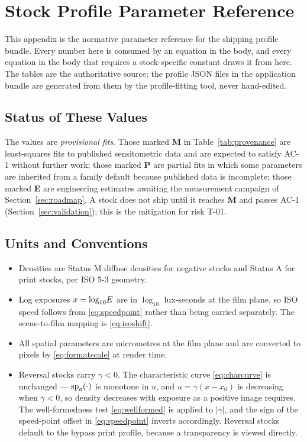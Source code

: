 \section{Stock Profile Parameter Reference}
\label{app:stockparams}

This appendix is the normative parameter reference for the shipping profile
bundle. Every number here is consumed by an equation in the body, and every
equation in the body that requires a stock-specific constant draws it from
here. The tables are the authoritative source; the profile JSON files in the
application bundle are generated from them by the profile-fitting tool, never
hand-edited.

\subsection{Status of These Values}

The values are \emph{provisional fits}. Those marked \textbf{M} in
Table~\ref{tab:provenance} are least-squares fits to published sensitometric
data and are expected to satisfy AC-1 without further work; those marked
\textbf{P} are partial fits in which some parameters are inherited from a
family default because published data is incomplete; those marked \textbf{E}
are engineering estimates awaiting the measurement campaign of
Section~\ref{sec:roadmap}. A stock does not ship until it reaches \textbf{M}
and passes AC-1 (Section~\ref{sec:validation}); this is the mitigation for
risk T-01.

\subsection{Units and Conventions}

\begin{itemize}
\item Densities are Status M diffuse densities for negative stocks and
Status A for print stocks, per ISO 5-3 geometry.
\item Log exposures $x = \log_{10}\!E$ are in $\log_{10}$ lux-seconds at the film
plane, so ISO speed follows from \eqref{eq:speedpoint} rather than being
carried separately. The scene-to-film mapping is \eqref{eq:isoshift}.
\item All spatial parameters are micrometres at the film plane and are
converted to pixels by \eqref{eq:formatscale} at render time.
\item Reversal stocks carry $\gamma < 0$. The characteristic curve
\eqref{eq:charcurve} is unchanged --- $\mathrm{sp}_{a}\!\left(\cdot\right)$ is monotone in $u$, and
$u = \gamma(x - x_0)$ is decreasing when $\gamma < 0$, so density decreases with
exposure as a positive image requires. The well-formedness test
\eqref{eq:wellformed} is applied to $|\gamma|$, and the sign of the speed-point
offset in \eqref{eq:speedpoint} inverts accordingly. Reversal stocks default to
the bypass print profile, because a transparency is viewed directly.
\end{itemize}

